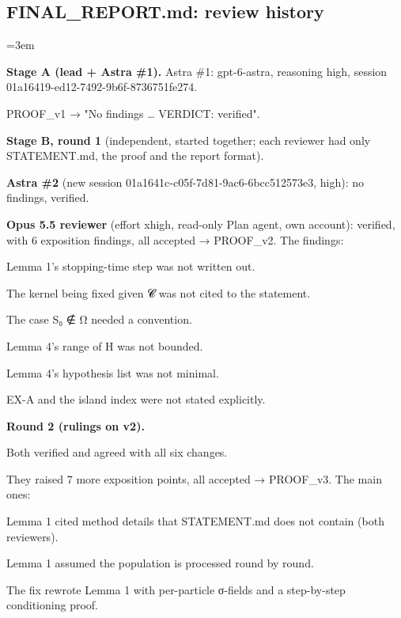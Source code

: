 \documentclass[11pt]{report}
\newenvironment{mdblock}{\begingroup\mdfont\raggedright\setlength{\parindent}{0pt}\setlength{\parskip}{0.55em}\emergencystretch=3em}{\par\endgroup}
\newcommand{\mdhead}[2]{\par\vspace{0.7em}\noindent{\bfseries\ifcase#1\or\large\or\normalsize\or\normalsize\or\small\or\small\or\small\fi #2}\par\nopagebreak\vspace{0.1em}}
\newcommand{\mdsubsec}[1]{\phantomsection\subsection*{#1}}
\begin{document}
\mdsubsec{FINAL\_REPORT.md: review history}
\begin{mdblock}
\mdhead{2}{Review history}

\textbf{Stage A (lead + Astra \#1).} Astra \#1: gpt-6-astra, reasoning high, session 01a16419-ed12-7492-9b6f-8736751fe274.

\begin{mdbul}
\item PROOF\_v1 → "No findings … VERDICT: verified".
\end{mdbul}

\textbf{Stage B, round 1} (independent, started together; each reviewer had only STATEMENT.md, the proof and the report format).

\begin{mdbul}
\item \textbf{Astra \#2} (new session 01a1641c-c05f-7d81-9ac6-6bcc512573e3, high): no findings, verified.
\item \textbf{Opus 5.5 reviewer} (effort xhigh, read-only Plan agent, own account): verified, with 6 exposition findings, all accepted → PROOF\_v2. The findings:

\begin{mdbul}
\item Lemma 1's stopping-time step was not written out.
\item The kernel being fixed given 𝓒 was not cited to the statement.
\item The case S₀ ∉ Ω needed a convention.
\item Lemma 4's range of H was not bounded.
\item Lemma 4's hypothesis list was not minimal.
\item EX-A and the island index were not stated explicitly.
\end{mdbul}
\end{mdbul}

\textbf{Round 2 (rulings on v2).}

\begin{mdbul}
\item Both verified and agreed with all six changes.
\item They raised 7 more exposition points, all accepted → PROOF\_v3. The main ones:

\begin{mdbul}
\item Lemma 1 cited method details that STATEMENT.md does not contain (both reviewers).
\item Lemma 1 assumed the population is processed round by round.
\end{mdbul}
\item The fix rewrote Lemma 1 with per-particle σ-fields and a step-by-step conditioning proof.
\end{mdbul}


\end{mdblock}
\end{document}
